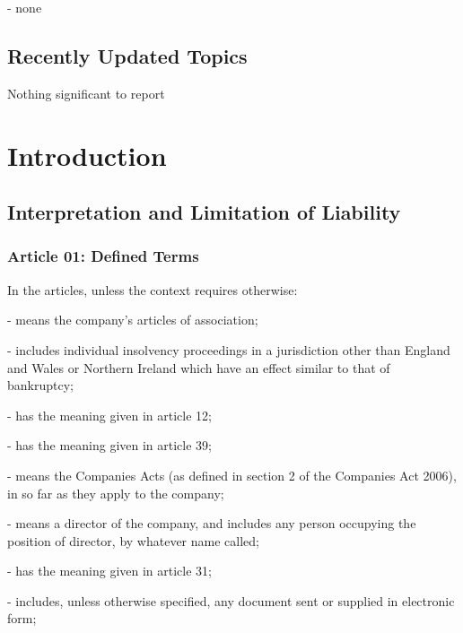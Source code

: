 \documentclass[letterpaper,10pt,openany,oneside,english]{sphinxmanual}
\begin{document}
 - none


\section{Recently Updated Topics}
\label{\detokenize{releasenotes:recently-updated-topics}}
Nothing significant to report


\chapter{Introduction}
\label{\detokenize{introduction:introduction}}\label{\detokenize{introduction::doc}}

\section{Interpretation and Limitation of Liability}
\label{\detokenize{introduction:interpretation-and-limitation-of-liability}}

\subsection{Article 01: Defined Terms}
\label{\detokenize{introduction:article-01-defined-terms}}
In the articles, unless the context requires otherwise:

 - means the company’s articles of association;

 - includes individual insolvency proceedings in a jurisdiction other than England and Wales or Northern Ireland which have an effect similar to that of bankruptcy;

 - has the meaning given in article 12;

 - has the meaning given in article 39;

 - means the Companies Acts (as defined in section 2 of the Companies Act 2006), in so far as they apply to the company;

 - means a director of the company, and includes any person occupying the position of director, by whatever name called;

 - has the meaning given in article 31;

 - includes, unless otherwise specified, any document sent or supplied in electronic form;
\end{document}
